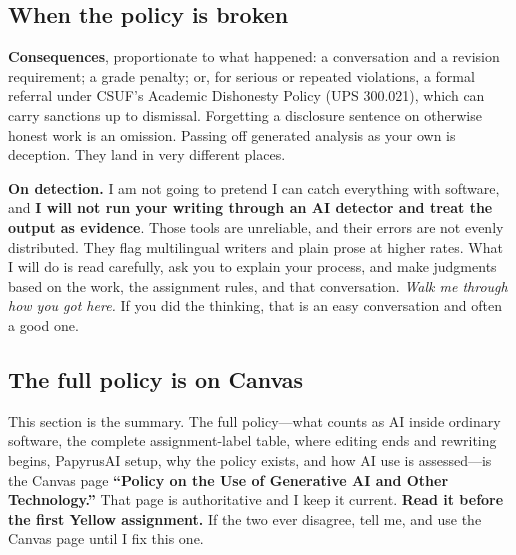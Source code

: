 \documentclass[12pt]{article}
\begin{document}
\subsection*{When the policy is broken}

\noindent \textbf{Consequences}, proportionate to what happened: a conversation and a revision requirement; a grade penalty; or, for serious or repeated violations, a formal referral under CSUF's Academic Dishonesty Policy (UPS 300.021), which can carry sanctions up to dismissal. Forgetting a disclosure sentence on otherwise honest work is an omission. Passing off generated analysis as your own is deception. They land in very different places.

\vspace{0.5em}
\noindent \textbf{On detection.} I am not going to pretend I can catch everything with software, and \textbf{I will not run your writing through an AI detector and treat the output as evidence}. Those tools are unreliable, and their errors are not evenly distributed. They flag multilingual writers and plain prose at higher rates. What I will do is read carefully, ask you to explain your process, and make judgments based on the work, the assignment rules, and that conversation. \emph{Walk me through how you got here.} If you did the thinking, that is an easy conversation and often a good one.

\subsection*{The full policy is on Canvas}

This section is the summary. The full policy---what counts as AI inside ordinary software, the complete assignment-label table, where editing ends and rewriting begins, PapyrusAI setup, why the policy exists, and how AI use is assessed---is the Canvas page \textbf{``Policy on the Use of Generative AI and Other Technology.''} That page is authoritative and I keep it current. \textbf{Read it before the first Yellow assignment.} If the two ever disagree, tell me, and use the Canvas page until I fix this one.
\end{document}
